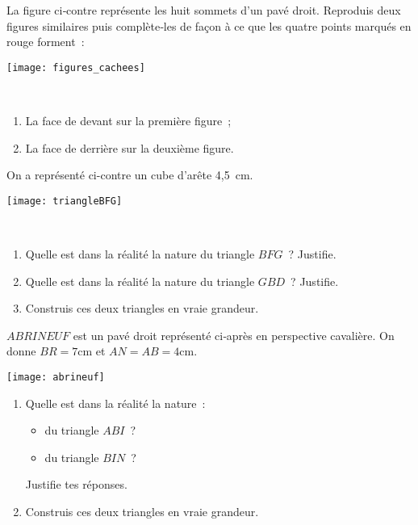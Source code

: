\begin{exercice}
\begin{minipage}[c]{0.48\linewidth}
La figure ci‑contre représente les huit sommets d'un pavé droit. Reproduis deux   figures similaires puis complète‑les de façon à ce que les quatre points marqués en rouge forment :
 \end{minipage} \hfill%
 \begin{minipage}[c]{0.48\linewidth}
  \texttt{[image: figures\_cachees]}
  \end{minipage} \\
\begin{enumerate}
 \item La face de devant sur la première figure ;
 \item La face de derrière sur la deuxième figure.
 \end{enumerate}
\end{exercice}


\begin{exercice}
\begin{minipage}[c]{0.38\linewidth}
On a représenté ci-contre un cube d'arête 4,5 cm.
 \end{minipage} \hfill%
 \begin{minipage}[c]{0.58\linewidth}
  \texttt{[image: triangleBFG]}
  \end{minipage} \\
\begin{enumerate}
 \item Quelle est dans la réalité la nature du triangle $BFG$ ? Justifie.
 \item Quelle est dans la réalité la nature du triangle $GBD$ ? Justifie.
 \item Construis ces deux triangles en vraie grandeur.
 \end{enumerate}
\end{exercice}


\begin{exercice} \label{VolSol_approf1}
$ABRINEUF$ est un pavé droit représenté ci‑après en perspective cavalière. On donne $BR = 7 \text{cm}$ et $AN = AB = 4 \text{cm}$.
 \begin{center} \texttt{[image: abrineuf]} \end{center}
 \begin{enumerate}
  \item Quelle est dans la réalité la nature :
  \begin{itemize}
   \item du triangle $ABI$ ?
   \item du triangle $BIN$ ?
    \end{itemize}
Justifie tes réponses.
 \item Construis ces deux triangles en vraie grandeur.
 \end{enumerate}
\end{exercice}


